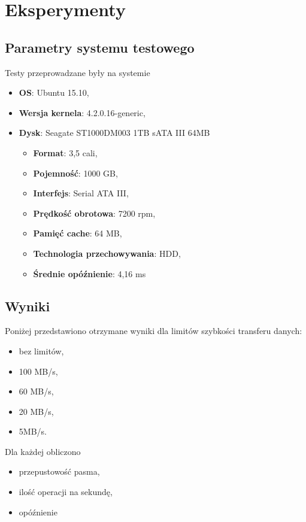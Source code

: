 \chapter{Eksperymenty} \label{ch:experiments}

\section{Parametry systemu testowego}

Testy przeprowadzane były na systemie
\begin{itemize}
	\item \textbf{OS}: Ubuntu 15.10,
    \item \textbf{Wersja kernela}: 4.2.0.16-generic,
    \item \textbf{Dysk}: Seagate ST1000DM003 1TB sATA III 64MB
    \begin{itemize}
    	\item \textbf{Format}: 3,5 cali,
        \item \textbf{Pojemność}: 1000 GB,
        \item \textbf{Interfejs}: Serial ATA III,
        \item \textbf{Prędkość obrotowa}: 7200 rpm,
        \item \textbf{Pamięć cache}: 64 MB,
        \item \textbf{Technologia przechowywania}: HDD,
        \item \textbf{Średnie opóźnienie}: 4,16 ms
    \end{itemize}
\end{itemize}
\section{Wyniki}

Poniżej przedstawiono otrzymane wyniki dla limitów szybkości transferu danych: 
\begin{itemize}
	\item bez limitów,
    \item 100 MB/s,
    \item 60 MB/s,
	\item 20 MB/s, 
    \item 5MB/s.
\end{itemize}

Dla każdej obliczono
\begin{itemize}
	\item przepustowość pasma,
    \item ilość operacji na sekundę,
    \item opóźnienie
\end{itemize}


